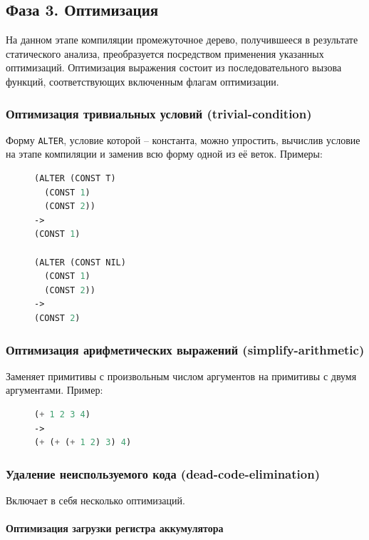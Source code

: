 \subsection{Фаза 3. Оптимизация}

На данном этапе компиляции промежуточное дерево, получившееся в результате статического анализа, преобразуется посредством применения указанных оптимизаций. Оптимизация выражения состоит из последовательного вызова функций, соответствующих включенным флагам оптимизации.


\subsubsection{Оптимизация тривиальных условий (trivial-condition)}

Форму \texttt{ALTER}, условие которой -- константа, можно упростить, вычислив условие на этапе компиляции и заменив всю форму одной из её веток. Примеры:

\begin{figure}[H]
\begin{lstlisting}[language=Lisp]
(ALTER (CONST T)
  (CONST 1)
  (CONST 2))
->
(CONST 1)

(ALTER (CONST NIL)
  (CONST 1)
  (CONST 2))
->
(CONST 2)
\end{lstlisting}
\end{figure}


\subsubsection{Оптимизация арифметических выражений (simplify-arithmetic)}

Заменяет примитивы с произвольным числом аргументов на примитивы с двумя аргументами. Пример:

\begin{figure}[H]
\begin{lstlisting}[language=Lisp]
(+ 1 2 3 4)
->
(+ (+ (+ 1 2) 3) 4)
\end{lstlisting}
\end{figure}


\subsubsection{Удаление неиспользуемого кода (dead-code-elimination)}

Включает в себя несколько оптимизаций.


\paragraph{Оптимизация загрузки регистра аккумулятора}

